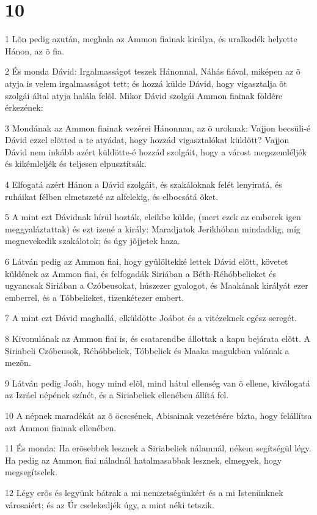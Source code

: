 \chapter{10}

\par 1 Lõn pedig azután, meghala az Ammon fiainak királya, és uralkodék helyette Hánon, az õ fia.
\par 2 És monda Dávid: Irgalmasságot teszek Hánonnal, Náhás fiával, miképen az õ atyja is velem irgalmasságot tett; és hozzá külde Dávid, hogy vigasztalja õt szolgái által atyja halála felõl. Mikor Dávid szolgái Ammon fiainak földére érkezének:
\par 3 Mondának az Ammon fiainak vezérei Hánonnan, az õ uroknak: Vajjon becsüli-é Dávid ezzel elõtted a te atyádat, hogy hozzád vigasztalókat küldött? Vajjon Dávid nem inkább azért küldötte-é hozzád szolgáit, hogy a várost megszemléljék és kikémleljék és teljesen elpusztítsák.
\par 4 Elfogatá azért Hánon a Dávid szolgáit, és szakáloknak felét lenyiratá, és ruháikat félben elmetszeté az alfelekig, és elbocsátá õket.
\par 5 A mint ezt Dávidnak hírül hozták, eleikbe külde, (mert ezek az emberek igen meggyaláztattak) és ezt izené a király: Maradjatok Jerikhóban mindaddig, míg megnevekedik szakálotok; és úgy jõjjetek haza.
\par 6 Látván pedig az Ammon fiai, hogy gyûlöltekké lettek Dávid elõtt, követet küldének az Ammon fiai, és felfogadák Siriában a Béth-Réhóbbelieket és ugyancsak Siriában a Czóbeusokat, húszezer gyalogot, és Maakának királyát ezer emberrel, és a Tóbbelieket, tizenkétezer embert.
\par 7 A mint ezt Dávid maghallá, elküldötte Joábot és a vitézeknek egész seregét.
\par 8 Kivonulának az Ammon fiai is, és csatarendbe állottak a kapu bejárata elõtt. A Siriabeli Czóbeusok, Réhóbbeliek, Tóbbeliek és Maaka magukban valának a mezõn.
\par 9 Látván pedig Joáb, hogy mind elõl, mind hátul ellenség van õ ellene, kiválogatá az Izráel népének színét, és a Siriabeliek ellenében állítá fel.
\par 10 A népnek maradékát az õ öcscsének, Abisainak vezetésére bízta, hogy felállítsa azt Ammon fiainak ellenében.
\par 11 És monda: Ha erõsebbek lesznek a Siriabeliek nálamnál, nékem segítségül légy. Ha pedig az Ammon fiai náladnál hatalmasabbak lesznek, elmegyek, hogy megsegítselek.
\par 12 Légy erõs és legyünk bátrak a mi nemzetségünkért és a mi Istenünknek városaiért; és az Úr cselekedjék úgy, a mint néki tetszik.
